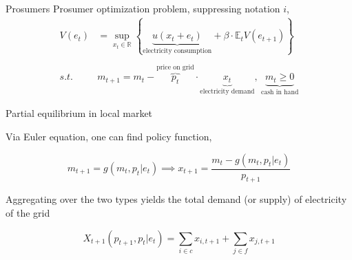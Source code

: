 \documentclass[xcolor={svgnames}]{beamer}
\newcommand{\E}{\mathbb{E}}
\newcommand{\R}{\mathbb{R}}
\begin{document}
\begin{frame}{Prosumers}
    Prosumer optimization problem, suppressing notation $i$,
    \begin{equation*}
        \begin{split}
            V(e_t) &= \sup_{x_t \in \R} \left\{\underbrace{u(x_t + e_t)}_{\text{electricity consumption}} + \beta \cdot \E_t V( e_{t+1} ) \right\} \\
            \\
            \textit{s.t. } &m_{t+1} = m_{t} - \overbrace{p_{t}}^{\text{price on grid}} \cdot \underbrace{x_{t}}_{\text{electricity demand}}, \ \underbrace{m_t  \geq 0}_{\text{cash in hand}}
        \end{split}
    \end{equation*}
\end{frame}

\begin{frame}{Partial equilibrium in local market}

    Via Euler equation, one can find policy function,

    \begin{equation}
        m_{t+1} = g(m_t, p_t \vert e_t) \implies x_{t+1} = \frac{m_t - g(m_t, p_t \vert e_t)}{p_{t+1}}
    \end{equation}

    Aggregating over the two types yields the total demand (or supply) of electricity of the grid

    \begin{equation}
        X_{t+1}(p_{t+1}, p_t \vert e_t) = \sum_{i \in c} x_{i, t+1} + \sum_{j \in f} x_{j, t+1}
    \end{equation}

\end{frame}
\end{document}
